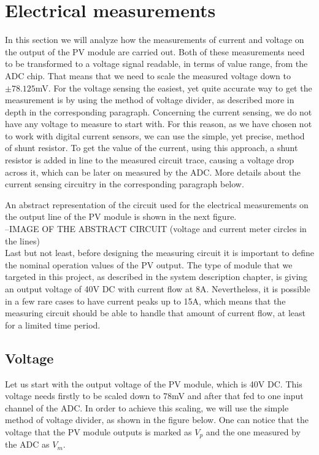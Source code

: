 \section{Electrical measurements}
In this section we will analyze how the measurements of current and voltage on the output of the PV module are carried out. Both of these measurements need to be transformed to a voltage signal readable, in terms of value range, from the ADC chip. That means that we need to scale the measured voltage down to $\pm 78.125$mV. For the voltage sensing the easiest, yet quite accurate way to get the measurement is by using the method of voltage divider, as described more in depth in the corresponding paragraph. Concerning the current sensing, we do not have any voltage to measure to start with. For this reason, as we have chosen not to work with digital current sensors, we can use the simple, yet precise, method of shunt resistor. To get the value of the current, using this approach, a shunt resistor is added in line to the measured circuit trace, causing a voltage drop across it, which can be later on measured by the ADC. More details about the current sensing circuitry in the corresponding paragraph below.

An abstract representation of the circuit used for the electrical measurements on the output line of the PV module is shown in the next figure.\\

--IMAGE OF THE ABSTRACT CIRCUIT (voltage and current meter circles in the lines)\\

Last but not least, before designing the measuring circuit it is important to define the nominal operation values of the PV output. The type of module that we targeted in this project, as described in the system description chapter, is giving an output voltage of 40V DC with current flow at 8A. Nevertheless, it is possible in a few rare cases to have current peaks up to 15A, which means that the measuring circuit should be able to handle that amount of current flow, at least for a limited time period.

\subsection{Voltage}
Let us start with the output voltage of the PV module, which is 40V DC. This voltage needs firstly to be scaled down to 78mV and after that fed to one input channel of the ADC. In order to achieve this scaling, we will use the simple method of voltage divider, as shown in the figure below. One can notice that the voltage that the PV module outputs is marked as $V_p$ and the one measured by the ADC as $V_m$.\\


